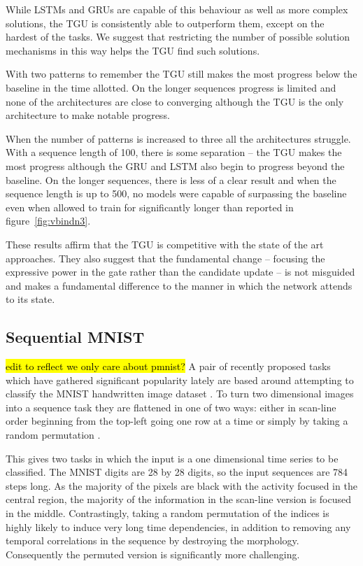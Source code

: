 While LSTMs and GRUs are capable of this behaviour as well as more complex solutions,
the TGU is consistently able to outperform them, except on the hardest of the tasks.
We suggest that restricting the number of possible solution mechanisms in this way
helps the TGU find such solutions.

With two patterns to remember the TGU still makes the most progress 
below the baseline in the time allotted.
On the longer sequences progress is limited and none of the architectures
are close to converging although the TGU is the only architecture to
make notable progress.

When the number of patterns is increased to three all the architectures struggle.
With a sequence length of 100, there is some separation -- the TGU makes the most
progress although the GRU and LSTM also begin to progress beyond the baseline.
On the longer sequences, there is less of a clear result and when the sequence
length is up to 500, no models were capable of surpassing the baseline even when
allowed to train for significantly longer than reported in figure~\ref{fig:vbindn3}.

These results affirm that the TGU is competitive with the state of the art approaches.
They also suggest that the fundamental change -- focusing the expressive power in the
gate rather than the candidate update -- is not misguided and makes a fundamental
difference to the manner in which the network attends to its state.


\subsection{Sequential MNIST}
\hl{edit to reflect we only care about pmnist?}
A pair of recently proposed tasks which have gathered significant popularity lately
are based around attempting to classify the MNIST handwritten image dataset 
\autocite{Lecun1998}. To turn two dimensional images into a sequence task they are
flattened in one of two ways: either in scan-line order beginning from the top-left
going one row at a time or simply by taking a random permutation \autocite{Le2015}.

This gives two tasks in which the input is a one dimensional time series to be
classified. The MNIST digits are 28 by 28 digits, so the input sequences are
784 steps long. As the majority of the pixels are black with the activity focused
in the central region, the majority of the information in the scan-line version
is focused in the middle. Contrastingly, taking a random permutation of the indices
is highly likely to induce very long time dependencies, in addition to removing
any temporal correlations in the sequence by destroying the morphology. Consequently
the permuted version is significantly more challenging.

